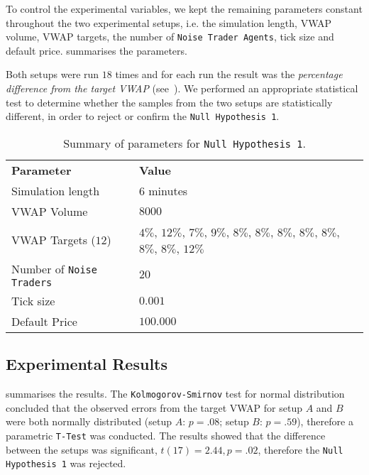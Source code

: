 To control the experimental variables, we kept the remaining parameters constant throughout the two experimental setups, i.e. the simulation length, VWAP volume, VWAP targets, the number of \texttt{Noise Trader Agents}, tick size and default price.  summarises the parameters.

Both setups were run $18$ times and for each run the result was the \textit{percentage difference from the target VWAP} (see~). We performed an appropriate statistical test to determine whether the samples from the two setups are statistically different, in order to reject or confirm the \texttt{Null~Hypothesis~1}.

\begin{table}[htbp]
\begin{center}
\begin{tabular}{ l p{2in} }
\textbf{Parameter} & \textbf{Value} \\
\cmidrule(r){1-2}

Simulation length		& $6$ minutes  	\\ 
VWAP Volume				& $8000$  		\\ 
VWAP Targets ($12$)			& $4\%$, $12\%$, $7\%$, $9\%$, $8\%$, $8\%$,
            $8\%$, $8\%$, $8\%$, $8\%$, $8\%$, $12\%$ \\ 
Number of \texttt{Noise Traders}  	& $20$	\\
Tick size  	& $0.001$	\\
Default Price  	& $100.000$	\\

\end{tabular}
\end{center}
\caption{Summary of parameters for \texttt{Null Hypothesis 1}.}
\label{Tables/Null-Hypothesis-1/Parameters}
\end{table}

\FloatBarrier
\subsection{Experimental Results}
 summarises the results. The \texttt{Kolmogorov-Smirnov} test for normal distribution concluded that the observed errors from the target VWAP for setup $A$ and $B$ were both normally distributed (setup $A$: $p=.08$; setup $B$: $p=.59$), therefore a parametric \texttt{T-Test} was conducted. The results showed that the difference between the setups was significant, $t(17)=2.44, p=.02$, therefore the \texttt{Null Hypothesis 1} was rejected. 


